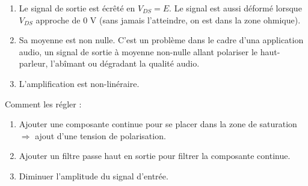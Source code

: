 \documentclass{../../template/labo}
\begin{document}
{
\begin{enumerate}
	\item Le signal de sortie est écrêté en $V_{DS} = E$. Le signal est aussi déformé lorsque $V_{DS}$ approche de 0 V (sans jamais l'atteindre, on est dans la zone ohmique).
	\item Sa moyenne est non nulle. C'est un problème dans le cadre d'una application audio, un signal de sortie à moyenne non-nulle allant polariser le haut-parleur, l'abîmant ou dégradant la qualité audio.
	\item L'amplification est non-linéraire.
\end{enumerate}

Comment les régler : 
\begin{enumerate}
    \item Ajouter une composante continue pour se placer dans la zone de saturation $\Longrightarrow$ ajout d'une tension de polarisation.
    \item Ajouter un filtre passe haut en sortie pour filtrer la composante continue.
    \item Diminuer l'amplitude du signal d'entrée.
\end{enumerate}
\label{Q:2elts2}
}



{}



\end{document}
